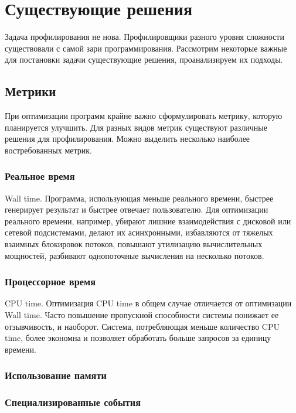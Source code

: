 \section{Существующие решения}
Задача профилирования не нова.
Профилировщики разного уровня сложности существовали с самой зари программирования.
Рассмотрим некоторые важные для постановки задачи существующие решения, проанализируем их подходы.

\subsection{Метрики}
При оптимизации программ крайне важно сформулировать метрику, которую планируется улучшить.
Для разных видов метрик существуют различные решения для профилирования. Можно выделить несколько наиболее востребованных метрик.

\subsubsection{Реальное время}
Wall time. Программа, использующая меньше реального времени, быстрее генерирует результат и быстрее отвечает пользователю. Для оптимизации реального времени, например, убирают лишние взаимодействия с дисковой или сетевой подсистемами, делают их асинхронными, избавляются от тяжелых взаимных блокировок потоков, повышают утилизацию вычислительных мощностей, разбивают однопоточные вычисления на несколько потоков.

\subsubsection{Процессорное время}
CPU time. Оптимизация CPU time в общем случае отличается от оптимизации Wall time. Часто повышение пропускной способности системы понижает ее отзывчивость, и наоборот. Система, потребляющая меньше количество CPU time, более экономна и позволяет обработать больше запросов за единицу времени.

\subsubsection{Использование памяти}

\subsubsection{Специализированные события}

